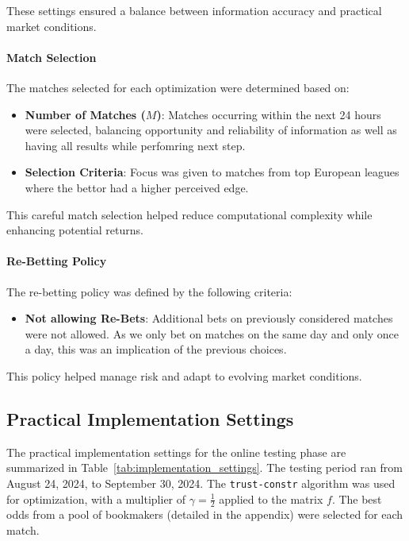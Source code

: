 These settings ensured a balance between information accuracy and practical market conditions.

\paragraph{Match Selection}

The matches selected for each optimization were determined based on:

\begin{itemize}
    \item \textbf{Number of Matches (\( M \))}: Matches occurring within the next 24 hours were selected, balancing opportunity and reliability of information as well as having all results while perfomring next step.
    \item \textbf{Selection Criteria}: Focus was given to matches from top European leagues where the bettor had a higher perceived edge.
\end{itemize}

This careful match selection helped reduce computational complexity while enhancing potential returns.

\paragraph{Re-Betting Policy}

The re-betting policy was defined by the following criteria:

\begin{itemize}
    \item \textbf{Not allowing Re-Bets}: Additional bets on previously considered matches were not allowed. As we only bet on matches on the same day and only once a day, this was an implication of the previous choices.
\end{itemize}

This policy helped manage risk and adapt to evolving market conditions.

\subsection{Practical Implementation Settings}

The practical implementation settings for the online testing phase are summarized in Table~\ref{tab:implementation_settings}. The testing period ran from August 24, 2024, to September 30, 2024. The \texttt{trust-constr} algorithm was used for optimization, with a multiplier of \( \gamma = \frac{1}{2} \) applied to the matrix \( f \). The best odds from a pool of bookmakers (detailed in the appendix) were selected for each match.

